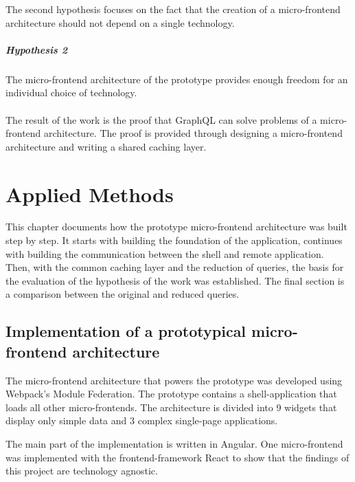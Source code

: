 \documentclass[MSE,Master,english]{twbook}%
\begin{document}
The second hypothesis focuses on the fact that the creation of a micro-frontend architecture should not depend on a single technology.

\paragraph{Hypothesis 2}
The micro-frontend architecture of the prototype provides enough freedom for an individual choice of technology.\\\\

The result of the work is the proof that GraphQL can solve problems of a micro-frontend architecture. The proof is provided through designing a micro-frontend architecture and writing a shared caching layer.

\chapter{Applied Methods}\label{chapter:applied-methods}

This chapter documents how the prototype micro-frontend architecture was built step by step. It starts with building the foundation of the application, continues with building the communication between the shell and remote application. Then, with the common caching layer and the reduction of queries, the basis for the evaluation of the hypothesis of the work was established. The final section is a comparison between the original and reduced queries.

\section{Implementation of a prototypical micro-frontend architecture}

The micro-frontend architecture that powers the prototype was developed using Webpack's Module Federation. The prototype contains a shell-application that loads all other micro-frontends. The architecture is divided into 9 widgets that display only simple data and 3 complex single-page applications.

The main part of the implementation is written in Angular. One micro-frontend was implemented with the frontend-framework React to show that the findings of this project are technology agnostic.

\end{document}
